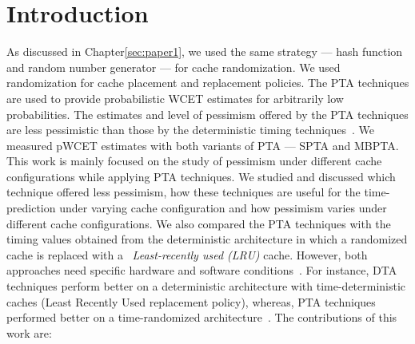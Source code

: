 \section{Introduction}
\label{intro}

As discussed in Chapter\ref{sec:paper1}, we used the same strategy --- hash function and random number generator --- for cache randomization. We used randomization for cache placement and replacement policies.  The PTA techniques are used to provide probabilistic WCET estimates for arbitrarily low probabilities. The estimates and level of pessimism offered by the PTA techniques are less pessimistic than those by the deterministic timing techniques~\cite{abella2014comparison}. We measured pWCET estimates  with both variants of PTA --- SPTA and MBPTA. This work is mainly focused on the study of pessimism under different cache configurations while applying PTA techniques. We studied and discussed which technique offered less pessimism, how these techniques are useful for the time-prediction under varying cache configuration and how pessimism varies under different cache configurations. We also compared the PTA techniques with the timing values obtained from the deterministic architecture in which a randomized cache is replaced with a ~\textit{Least-recently used (LRU)} cache. However, both approaches need specific hardware and software conditions~\cite{abella2014comparison}. For instance, DTA techniques perform better on a deterministic architecture with time-deterministic caches (Least Recently Used replacement policy), whereas, PTA techniques performed better on a time-randomized architecture~\cite{abella2014comparison,anwar2015probabilistically}. 
\newline
The contributions of this work are:

